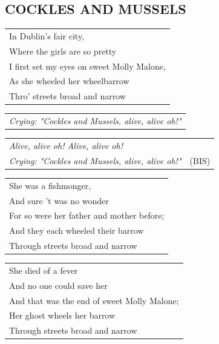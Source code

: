 \documentclass[a4paper, 14pt]{extarticle}
\begin{document}
\subsection*{COCKLES AND MUSSELS}
\begin{flushleft}
\begin{tabularx}{\textwidth} {
    >{\raggedright\arraybackslash}X}
In Dublin’s fair city,\\
Where the girls are so pretty\\
I first set my eyes on sweet Molly Malone,\\
As she wheeled her wheelbarrow\\
Thro’ streets broad and narrow\\
\end{tabularx}
\end{flushleft}
\begin{flushleft}
\begin{tabularx}{\textwidth} {
    >{\raggedright\arraybackslash}X}
\textit{Crying: "Cockles and Mussels, alive, alive oh!"}\\
\end{tabularx}
\begin{tabularx}{\textwidth} {
    >{\raggedright\arraybackslash}X |c}
\textit{Alive, alive oh! Alive, alive oh!} & \\
\textit{Crying: "Cockles and Mussels, alive, alive oh!"} & (BIS)\\
\end{tabularx}
\end{flushleft}
\begin{flushleft}
\begin{tabularx}{\textwidth} {
    >{\raggedright\arraybackslash}X}
She was a fishmonger,\\
And sure ’t was no wonder\\
For so were her father and mother before;\\
And they each wheeled their barrow\\
Through streets broad and narrow\\
\end{tabularx}
\end{flushleft}
\begin{flushleft}
\begin{tabularx}{\textwidth} {
    >{\raggedright\arraybackslash}X}
She died of a fever\\
And no one could save her\\
And that was the end of sweet Molly Malone;\\
Her ghost wheels her barrow\\
Through streets broad and narrow\\
\end{tabularx}
\end{flushleft}
\end{document}

